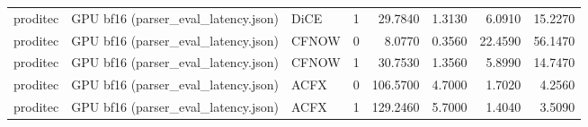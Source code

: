 \begin{tabular}{lllrrrrr}
proditec & GPU bf16 (parser\_eval\_latency.json) &            DiCE &            1 &        29.7840 &                   1.3130 &                    6.0910 &                    15.2270 \\
proditec & GPU bf16 (parser\_eval\_latency.json) &           CFNOW &            0 &         8.0770 &                   0.3560 &                   22.4590 &                    56.1470 \\
proditec & GPU bf16 (parser\_eval\_latency.json) &           CFNOW &            1 &        30.7530 &                   1.3560 &                    5.8990 &                    14.7470 \\
proditec & GPU bf16 (parser\_eval\_latency.json) &            ACFX &            0 &       106.5700 &                   4.7000 &                    1.7020 &                     4.2560 \\
proditec & GPU bf16 (parser\_eval\_latency.json) &            ACFX &            1 &       129.2460 &                   5.7000 &                    1.4040 &                     3.5090 \\
\bottomrule
\end{tabular}
